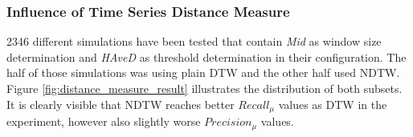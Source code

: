 \subsubsection{Influence of Time Series Distance Measure} \label{influence_of_time_series_distance_measure}
2346 different simulations have been tested that contain \textit{Mid} as window size determination and
\textit{HAveD} as threshold determination in their configuration. The half of those simulations was
using plain DTW and the other half used NDTW. Figure \ref{fig:distance_measure_result} illustrates the distribution of
both subsets. It is clearly visible that NDTW reaches better $Recall_{\mu}$ values as DTW in the experiment, however
also slightly worse $Precision_{\mu}$ values.


